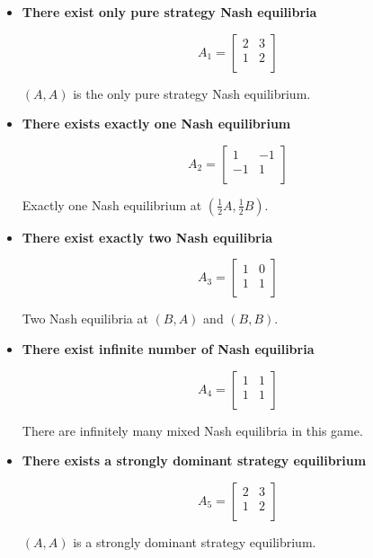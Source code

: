 \documentclass[12pt, a4paper]{article}
\begin{document}
\begin{itemize}
    \item \textbf{There exist only pure strategy Nash equilibria}
    
    \[A_1 = \begin{bmatrix}
        2 & 3 \\
        1 & 2 \\
    \end{bmatrix}\]

    $(A, A)$ is the only pure strategy Nash equilibrium.

    \item \textbf{There exists exactly one Nash equilibrium}
    
    \[A_2 = \begin{bmatrix}
        1 & -1 \\
        -1 & 1 \\
    \end{bmatrix}\]

    Exactly one Nash equilibrium at $(\frac{1}{2}A, \frac{1}{2}B)$.
    
    \item \textbf{There exist exactly two Nash equilibria}
    
    \[A_3 = \begin{bmatrix}
        1 & 0 \\
        1 & 1 \\
    \end{bmatrix}\]

    Two Nash equilibria at $(B, A)$ and $(B, B)$.
    
    \item \textbf{There exist infinite number of Nash equilibria}
    
    \[A_4 = \begin{bmatrix}
        1 & 1 \\
        1 & 1 \\
    \end{bmatrix}\]
    
    There are infinitely many mixed Nash equilibria in this game.
    
    \item \textbf{There exists a strongly dominant strategy equilibrium}
    
    \[A_5 = \begin{bmatrix}
        2 & 3 \\
        1 & 2 \\
    \end{bmatrix}\]

    $(A, A)$ is a strongly dominant strategy equilibrium.

\end{itemize}
\end{document}
